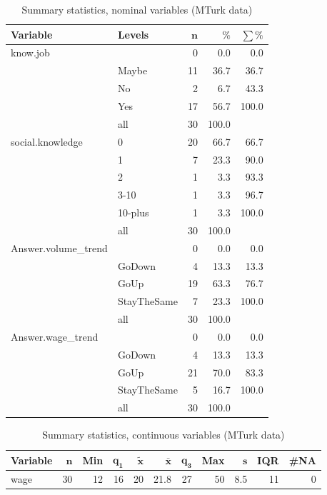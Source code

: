 \documentclass[a4paper,10pt]{article}\usepackage[]{graphicx}\usepackage[]{color}
\begin{document}
\begin{table}[ht]
\centering
{\footnotesize
\begin{tabular}{ll|rrr}
 \textbf{Variable} & \textbf{Levels} & $\mathbf{n}$ & $\mathbf{\%}$ & $\mathbf{\sum \%}$ \\ 
  \hline
know.job &  & 0 & 0.0 & 0.0 \\ 
   & Maybe & 11 & 36.7 & 36.7 \\ 
   & No & 2 & 6.7 & 43.3 \\ 
   & Yes & 17 & 56.7 & 100.0 \\ 
   \hline
 & all & 30 & 100.0 &  \\ 
   \hline
\hline
social.knowledge & 0 & 20 & 66.7 & 66.7 \\ 
   & 1 & 7 & 23.3 & 90.0 \\ 
   & 2 & 1 & 3.3 & 93.3 \\ 
   & 3-10 & 1 & 3.3 & 96.7 \\ 
   & 10-plus & 1 & 3.3 & 100.0 \\ 
   \hline
 & all & 30 & 100.0 &  \\ 
   \hline
\hline
Answer.volume\_trend &  & 0 & 0.0 & 0.0 \\ 
   & GoDown & 4 & 13.3 & 13.3 \\ 
   & GoUp & 19 & 63.3 & 76.7 \\ 
   & StayTheSame & 7 & 23.3 & 100.0 \\ 
   \hline
 & all & 30 & 100.0 &  \\ 
   \hline
\hline
Answer.wage\_trend &  & 0 & 0.0 & 0.0 \\ 
   & GoDown & 4 & 13.3 & 13.3 \\ 
   & GoUp & 21 & 70.0 & 83.3 \\ 
   & StayTheSame & 5 & 16.7 & 100.0 \\ 
   \hline
 & all & 30 & 100.0 &  \\ 
   \hline
\hline
\end{tabular}
}
\caption{Summary statistics, nominal variables (MTurk data)} 
\label{tab1:29-2050}
\end{table}
\begin{table}[ht]
\centering
{\footnotesize
\begin{tabular}{lrrrrrrrrrr}
 \textbf{Variable} & $\mathbf{n}$ & \textbf{Min} & $\mathbf{q_1}$ & $\mathbf{\widetilde{x}}$ & $\mathbf{\bar{x}}$ & $\mathbf{q_3}$ & \textbf{Max} & $\mathbf{s}$ & \textbf{IQR} & \textbf{\#NA} \\ 
  \hline
wage & 30 & 12 & 16 & 20 & 21.8 & 27 & 50 & 8.5 & 11 & 0 \\ 
  \end{tabular}
}
\caption{Summary statistics, continuous variables (MTurk data)} 
\label{tab2:29-2050}
\end{table}
\end{document}
